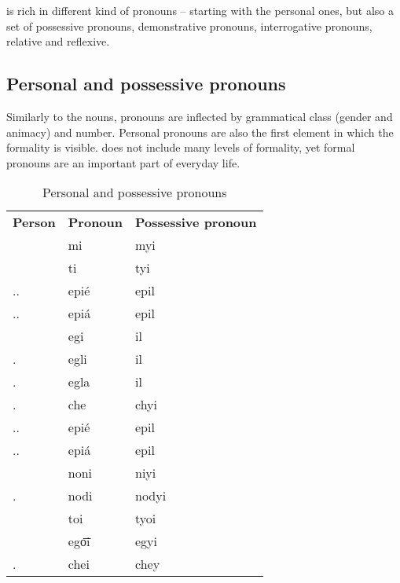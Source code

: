 \andro is rich in different kind of pronouns -- starting with the personal ones,
but also a set of possessive pronouns, demonstrative pronouns, interrogative
pronouns, relative and reflexive.

\subsection{Personal and possessive pronouns}

Similarly to the nouns, pronouns are inflected by grammatical class (gender and
animacy) and number. Personal pronouns are also the first element in which the
formality is visible. \andro does not include many levels of formality, yet
formal pronouns are an important part of everyday life.

\begin{table}[]
    \caption{Personal and possessive pronouns}
    \label{tab:pronouns}
    \begin{tabular}{lll}
        \textbf{Person}    & \textbf{Pronoun} & \textbf{Possessive pronoun} \\
        \Fsg{}             & mi               & myi                         \\
        \Ssg{}             & ti               & tyi                         \\
        \Ssg{}.\M{}.\Frm{} & epié             & epil                        \\
        \Ssg{}.\F{}.\Frm{} & epiá             & epil                        \\
        \Tsg{}             & egi              & il                          \\
        \Tsg{}.\M{}        & egli             & il                          \\
        \Tsg{}.\F{}        & egla             & il                          \\
        \Tsg{}.\Inan{}     & che              & chyi                        \\
        \Tsg{}.\M{}.\Frm{} & epié             & epil                        \\
        \Tsg{}.\F{}.\Frm{} & epiá             & epil                        \\
        \Fpl{}             & noni             & niyi                        \\
        \Fpl{}.\Excl{}     & nodi             & nodyi                       \\
        \Spl{}             & toi              & tyoi                        \\
        \Tpl{}             & ego͞i             & egyi                        \\
        \Tpl{}.\Inan{}     & chei             & chey
    \end{tabular}
\end{table}


